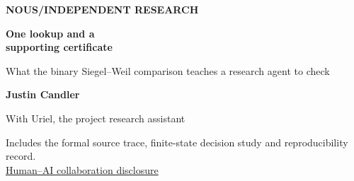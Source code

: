 \documentclass[12pt,letterpaper]{article}
\begin{document}
\thispagestyle{empty}
\begin{center}
\vspace*{.32in}
{\sffamily\small\bfseries\color{accent}NOUS\enspace /\enspace INDEPENDENT RESEARCH}\par
\vspace{.55in}
{\fontsize{33}{38}\selectfont\bfseries\color{ink}One lookup and a\\ supporting certificate\par}
\vspace{.3in}
\begin{minipage}{.88\linewidth}\centering\Large\color{mute}What the binary Siegel--Weil comparison teaches a research agent to check\end{minipage}\par
\vspace{.48in}
{\large\bfseries Justin Candler}\par
{\small With Uriel, the project research assistant}\par
\vspace{.2in}{\small 24 November 2026}\par
\vspace{.4in}\par
\end{center}\vfill
\begin{center}\small Includes the formal source trace, finite-state decision study and reproducibility record.\\[3pt]
\hyperref[collab]{Human--AI collaboration disclosure}\end{center}
\clearpage{}
\end{document}
